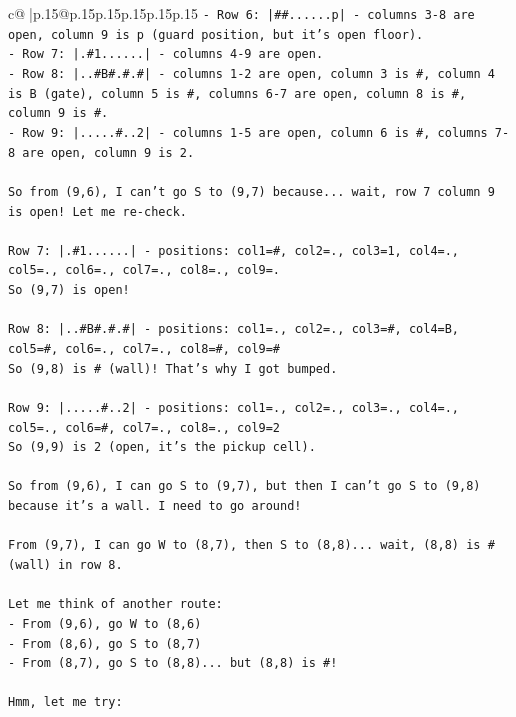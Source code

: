 \documentclass{article}
\begin{document}
{\begin{supertabular}{c@{$\;$}|p{.15\linewidth}@{}p{.15\linewidth}p{.15\linewidth}p{.15\linewidth}p{.15\linewidth}p{.15\linewidth}}
{{{\texttt{{-} Row 6: |\#\#......p| {-} columns 3{-}8 are open, column 9 is p (guard position, but it's open floor).} \\
\texttt{{-} Row 7: |.\#1......| {-} columns 4{-}9 are open.} \\
\texttt{{-} Row 8: |..\#B\#.\#.\#| {-} columns 1{-}2 are open, column 3 is \#, column 4 is B (gate), column 5 is \#, columns 6{-}7 are open, column 8 is \#, column 9 is \#.} \\
\texttt{{-} Row 9: |.....\#..2| {-} columns 1{-}5 are open, column 6 is \#, columns 7{-}8 are open, column 9 is 2.} \\
\\ 
\texttt{So from (9,6), I can't go S to (9,7) because... wait, row 7 column 9 is open! Let me re{-}check.} \\
\\ 
\texttt{Row 7: |.\#1......| {-} positions: col1=\#, col2=., col3=1, col4=., col5=., col6=., col7=., col8=., col9=.} \\
\texttt{So (9,7) is open!} \\
\\ 
\texttt{Row 8: |..\#B\#.\#.\#| {-} positions: col1=., col2=., col3=\#, col4=B, col5=\#, col6=., col7=., col8=\#, col9=\#} \\
\texttt{So (9,8) is \# (wall)! That's why I got bumped.} \\
\\ 
\texttt{Row 9: |.....\#..2| {-} positions: col1=., col2=., col3=., col4=., col5=., col6=\#, col7=., col8=., col9=2} \\
\texttt{So (9,9) is 2 (open, it's the pickup cell).} \\
\\ 
\texttt{So from (9,6), I can go S to (9,7), but then I can't go S to (9,8) because it's a wall. I need to go around!} \\
\\ 
\texttt{From (9,7), I can go W to (8,7), then S to (8,8)... wait, (8,8) is \# (wall) in row 8.} \\
\\ 
\texttt{Let me think of another route:} \\
\texttt{{-} From (9,6), go W to (8,6)} \\
\texttt{{-} From (8,6), go S to (8,7)} \\
\texttt{{-} From (8,7), go S to (8,8)... but (8,8) is \#!} \\
\\ 
\texttt{Hmm, let me try:} \\
}}}
\end{supertabular}}
\end{document}
